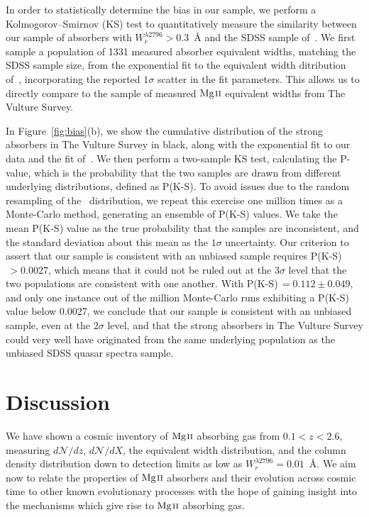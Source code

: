 \documentclass[iop,apj,numberedappendix,appendixfloats,twocolappendix]{emulateapj}
\begin{document}
In order to statistically determine the bias in our sample, we perform a Kolmogorov--Smirnov (KS) test to quantitatively measure the similarity between our sample of absorbers with $W_r^{\lambda2796} > 0.3$~{\AA} and the SDSS sample of~\cite{Nestor2005}. We first sample a population of 1331 measured absorber equivalent widths, matching the SDSS sample size, from the exponential fit to the equivalent width ditribution of~\cite{Nestor2005}, incorporating the reported $1\sigma$ scatter in the fit parameters. This allows us to directly compare to the sample of measured ${\hbox{{\rm Mg}\kern 0.1em{\sc ii}}}$ equivalent widths from The Vulture Survey.

In Figure~\ref{fig:bias}(b), we show the cumulative distribution of the strong absorbers in The Vulture Survey in black, along with the exponential fit to our data and the fit of~\cite{Nestor2005}. We then perform a two-sample KS test, calculating the P-value, which is the probability that the two samples are drawn from different underlying distributions, defined as P(K-S). To avoid issues due to the random resampling of the~\cite{Nestor2005} distribution, we repeat this exercise one million times as a Monte-Carlo method, generating an ensemble of P(K-S) values. We take the mean P(K-S) value as the true probability that the samples are inconsistent, and the standard deviation about this mean as the $1\sigma$ uncertainty. Our criterion to assert that our sample is consistent with an unbiased sample requires P(K-S)$\, > 0.0027$, which means that it could not be ruled out at the $3\sigma$ level that the two populations are consistent with one another. With P(K-S)$\, = 0.112 \pm 0.049$, and only one instance out of the million Monte-Carlo runs exhibiting a P(K-S) value below 0.0027, we conclude that our sample is consistent with an unbiased sample, even at the $2\sigma$ level, and that the strong absorbers in The Vulture Survey could very well have originated from the same underlying population as the unbiased SDSS quasar spectra sample.


\section{Discussion}
\label{sec:discussion}

We have shown a cosmic inventory of ${\hbox{{\rm Mg}\kern 0.1em{\sc ii}}}$ absorbing gas from $0.1 < z < 2.6$, measuring $d\mathcal{N}\!/dz$, $d\mathcal{N}\!/dX$, the equivalent width distribution, and the column density distribution down to detection limits as low as $W_r^{\lambda2796} = 0.01$~{\AA}. We aim now to relate the properties of ${\hbox{{\rm Mg}\kern 0.1em{\sc ii}}}$ absorbers and their evolution across cosmic time to other known evolutionary processes with the hope of gaining insight into the mechanisms which give rise to ${\hbox{{\rm Mg}\kern 0.1em{\sc ii}}}$ absorbing gas.
\end{document}
